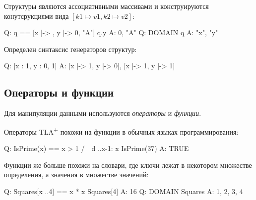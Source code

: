 \documentclass[14pt, openany]{report}
\newcommand{\tlapl}{TLA\textsuperscript{+} }
\begin{document}
Структуры являются ассоциативными массивами и конструируются конутсрукциями вида \([k1 \mapsto v1, k2 \mapsto v2]\):
\begin{tla}
  Q: q == [x |-> {}, y |-> {0, "A"}]
     q.y
  A: {0, "A"}
  Q: DOMAIN q
  A: {"x", "y"}
\end{tla}
\begin{tlatex}
%
%
%
%
\end{tlatex}

Определен синтаксис генераторов структур:

\begin{tla}
  Q: [x : {1}, y : {0, 1}]
  A: {[x |-> 1, y |-> 0], [x |-> 1, y |-> 1]}
\end{tla}
\begin{tlatex}
%
\end{tlatex}


\subsection{Операторы и функции}
Для манипуляции данными используются \emph{операторы} и \emph{функции}.

Операторы \tlapl похожи на функции в обычных языках программирования:

\begin{tla}
  Q: IsPrime(x) == x > 1 /\ ~\E d ..x-1: x %
     IsPrime(37)
  A: TRUE
\end{tla}
\begin{tlatex}
%
%
\end{tlatex}

Функции же больше похожи на словари, где ключи лежат в некотором множестве определения, а значения в множестве значений:

\begin{tla}
  Q: Squares[x ..4] == x * x
     Squares[4]
  A: 16
  Q: DOMAIN Squares
  A: {1, 2, 3, 4}
\end{tla}
\begin{tlatex}
%
%
%
%
\end{tlatex}
\end{document}

